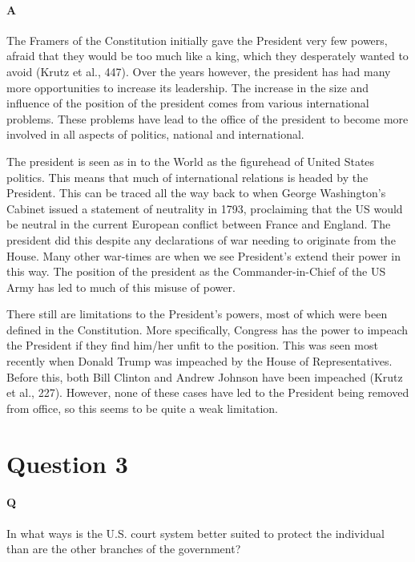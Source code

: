 \documentclass[12pt]{article}
\begin{document}
\paragraph{A}
The Framers of the Constitution initially gave the President very few
powers, afraid that they would be too much like a king, which they
desperately wanted to avoid (Krutz et al., 447). Over the years
however, the president has had many more opportunities to increase its
leadership. The increase in the size and influence of the position of
the president comes from various international problems.  These
problems have lead to the office of the president to become more
involved in all aspects of politics, national and international.
\par
The president is seen as in to the World as the figurehead of United
States politics. This means that much of international relations is
headed by the President. This can be traced all the way back to when
George Washington's Cabinet issued a statement of neutrality in 1793,
proclaiming that the US would be neutral in the current European
conflict between France and England. The president did this despite
any declarations of war needing to originate from the House. Many
other war-times are when we see President's extend their power in this
way. The position of the president as the Commander-in-Chief of the US
Army has led to much of this misuse of power.
\par
There still are limitations to the President's powers, most of which
were been defined in the Constitution. More specifically, Congress has
the power to impeach the President if they find him/her unfit to the
position. This was seen most recently when Donald Trump was impeached
by the House of Representatives. Before this, both Bill Clinton and
Andrew Johnson have been impeached (Krutz et al., 227). However,
none of these cases have led to the President being removed from
office, so this seems to be quite a weak limitation. 
\section*{Question 3}
\paragraph{Q}
In what ways is the U.S. court system better suited to protect the individual than
are the other branches of the government?
\end{document}
